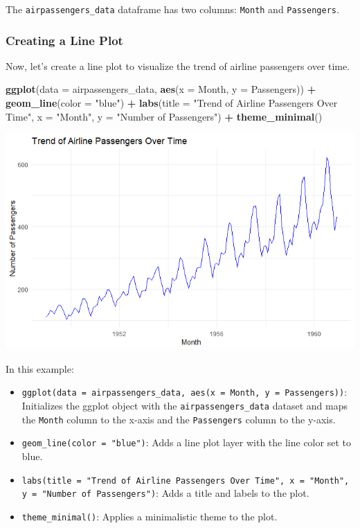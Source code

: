 \documentclass[
]{book}
\newenvironment{Shaded}{\begin{snugshade}}{\end{snugshade}}
\newcommand{\AttributeTok}[1]{\textcolor[rgb]{0.13,0.29,0.53}{#1}}
\newcommand{\FunctionTok}[1]{\textcolor[rgb]{0.13,0.29,0.53}{\textbf{#1}}}
\newcommand{\NormalTok}[1]{#1}
\newcommand{\SpecialCharTok}[1]{\textcolor[rgb]{0.81,0.36,0.00}{\textbf{#1}}}
\newcommand{\StringTok}[1]{\textcolor[rgb]{0.31,0.60,0.02}{#1}}
\begin{document}
The \texttt{airpassengers\_data} dataframe has two columns: \texttt{Month} and \texttt{Passengers}.

\hypertarget{creating-a-line-plot}{%
\subsubsection*{Creating a Line Plot}\label{creating-a-line-plot}}

Now, let's create a line plot to visualize the trend of airline passengers over time.

\begin{Shaded}
\begin{Highlighting}[]
\FunctionTok{ggplot}\NormalTok{(}\AttributeTok{data =}\NormalTok{ airpassengers\_data, }\FunctionTok{aes}\NormalTok{(}\AttributeTok{x =}\NormalTok{ Month, }\AttributeTok{y =}\NormalTok{ Passengers)) }\SpecialCharTok{+}
  \FunctionTok{geom\_line}\NormalTok{(}\AttributeTok{color =} \StringTok{"blue"}\NormalTok{) }\SpecialCharTok{+}
  \FunctionTok{labs}\NormalTok{(}\AttributeTok{title =} \StringTok{"Trend of Airline Passengers Over Time"}\NormalTok{,}
       \AttributeTok{x =} \StringTok{"Month"}\NormalTok{,}
       \AttributeTok{y =} \StringTok{"Number of Passengers"}\NormalTok{) }\SpecialCharTok{+}
  \FunctionTok{theme\_minimal}\NormalTok{()}
\end{Highlighting}
\end{Shaded}

\includegraphics{images/line_graph_example.PNG}

In this example:

\begin{itemize}
\item
  \texttt{ggplot(data\ =\ airpassengers\_data,\ aes(x\ =\ Month,\ y\ =\ Passengers))}: Initializes the ggplot object with the \texttt{airpassengers\_data} dataset and maps the \texttt{Month} column to the x-axis and the \texttt{Passengers} column to the y-axis.
\item
  \texttt{geom\_line(color\ =\ "blue")}: Adds a line plot layer with the line color set to blue.
\item
  \texttt{labs(title\ =\ "Trend\ of\ Airline\ Passengers\ Over\ Time",\ x\ =\ "Month",\ y\ =\ "Number\ of\ Passengers")}: Adds a title and labels to the plot.
\item
  \texttt{theme\_minimal()}: Applies a minimalistic theme to the plot.
\end{itemize}
\end{document}
